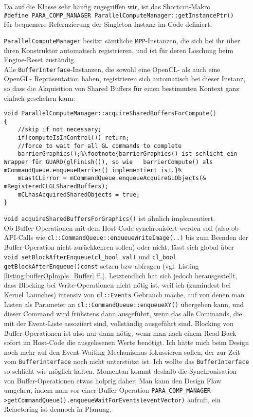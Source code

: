 	Da auf die Klasse sehr häufig zugegriffen wir, ist das Shortcut-Makro \\
	\lstinline|#define PARA_COMP_MANAGER ParallelComputeManager::getInstancePtr()|\\
	für bequemere Refernzierung der Singleton-Instanz im Code definiert.

	\lstinline|ParallelComputeManager| besitzt sämtliche \lstinline|MPP|-Instanzen, die sich bei ihr über ihren 
	Konstruktor automatisch registrieren,
	und ist für deren Löschung beim Engine-Reset zuständig.\\
	
	Alle \lstinline|BufferInterface|-Instanzen, die sowohl eine OpenCL- als auch eine OpenGL- Repräsentation
	haben, registrieren sich automatisch bei dieser Instanz, so dass die Akquisition von Shared Buffers
	für einen bestimmten Kontext ganz einfach geschehen kann:
	\begin{lstlisting}[escapechar=\%]
void ParallelComputeManager::acquireSharedBuffersForCompute()
{
	//skip if not necessary;
	if(computeIsInControl()) return;
	//force to wait for all GL commands to complete
	barrierGraphics();%\footnote{barrierGraphics() ist schlicht ein Wrapper für GUARD(glFinish()), so wie	barrierCompute() als mCommandQueue.enqueueBarrier() implementiert ist.}%
	mLastCLError = mCommandQueue.enqueueAcquireGLObjects(& mRegisteredCLGLSharedBuffers);
	mCLhasAcquiredSharedObjects = true;
}
	\end{lstlisting}
	\lstinline|void acquireSharedBuffersForGraphics()| ist ähnlich implementiert.\\
	
	Ob Buffer-Operationen mit dem Host-Code synchronisiert werden soll 
	(also ob API-Calls wie \lstinline|cl::CommandQueue::enqueueWriteImage(..)| bis zum Beenden der Buffer-Operation
	nicht zurückkehren sollen) oder nicht, lässt sich global über \lstinline|void setBlockAfterEnqueue(cl_bool val)|
	und \lstinline|cl_bool getBlockAfterEnqueue()const| setzen bzw abfragen 
	(vgl. Listing \ref{listing:bufferOpImpls_Buffer} ff.).
	Letztendlich hat sich jedoch herausgestellt, dass Blocking bei Write-Operationen nicht nötig ist, weil ich
	(zumindest bei Kernel Launches) intensiv von 
	\lstinline|cl::Events| Gebrauch mache, auf von denen man Listen als Parameter an 
	\lstinline|cl::CommandQueue::enqueueXY()|
	übergeben kann, und dieser Command wird frühstens dann ausgeführt, wenn das alle Commands, die mit der Event-Liste
	assoziiert sind, vollständig ausgeführt sind. Blocking von Buffer-Operationen ist also nur dann nötig, wenn man nach
	einem 	Read-Back sofort im Host-Code die ausgelesenen Werte benötigt. Ich hätte mich beim Design noch mehr auf den
	Event-Waiting-Mechanismus fokussieren sollen, der zur Zeit vom \lstinline|Bufferinterface| noch nicht unterstützt ist.
	Ich wollte das \lstinline|BufferInterface| so schlicht wie möglich halten. 
	Momentan kommt deshalb die Synchronisation von Buffer-Operationen etwas holprig daher; 
	Man kann den Design Flaw umgehen, indem man vor einer Buffer-Operation
	\lstinline|PARA_COMP_MANAGER->getCommandQueue().enqueueWaitForEvents(eventVector)| aufruft, ein Refactoring ist dennoch 
	in Planung.
	
